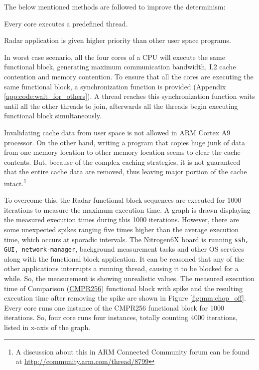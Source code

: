 \noindent
The below mentioned methods are followed to improve the determinism:
\begin{compactitem} 
	\item Every core executes a predefined thread.
	\item Radar application is given higher priority than other user space programs. \\
\end{compactitem} 

In worst case scenario, all the four cores of a CPU will execute the same functional block, generating maximum communication bandwidth, L2 cache contention and memory contention. To ensure that all the cores are executing the same functional block, a synchronization function is provided (Appendix \ref{app:code:wait_for_others}). A thread reaches this synchronization function waits until all the other threads to join, afterwards all the threads begin executing functional block simultaneously.

Invalidating cache data from user space is not allowed in ARM Cortex A9 processor. On the other hand, writing a program that copies huge junk of data from one memory location to other memory location seems to clear the cache contents. But, because of the complex caching strategies, it is not guaranteed that the entire cache data are removed, thus leaving major portion of the cache intact.\footnote{A discussion about this in ARM Connected Community forum can be found at \url{http://community.arm.com/thread/8799}} 

To overcome this, the Radar functional block sequences are executed for 1000 iterations to measure the maximum execution time. A graph is drawn displaying the measured execution times during this 1000 iterations. However, there are some unexpected spikes ranging five times higher than the average execution time, which occurs at sporadic intervals. The Nitrogen6X board is running \texttt{ssh, GUI, network-manager}, background measurement tasks and other OS services along with the functional block application. It can be reasoned that any of the other applications interrupts a running thread, causing it to be blocked for a while. So, the measurement is showing unrealistic values. The measured execution time of Comparison (\hyperlink{benchmarks}{CMPR256}) functional block with spike and the resulting execution time after removing the spike are shown in Figure \ref{fig:mm:chop_off}. Every core runs one instance of the CMPR256 functional block for 1000 iterations. So, four core runs four instances, totally counting 4000 iterations, listed in x-axis of the graph.

